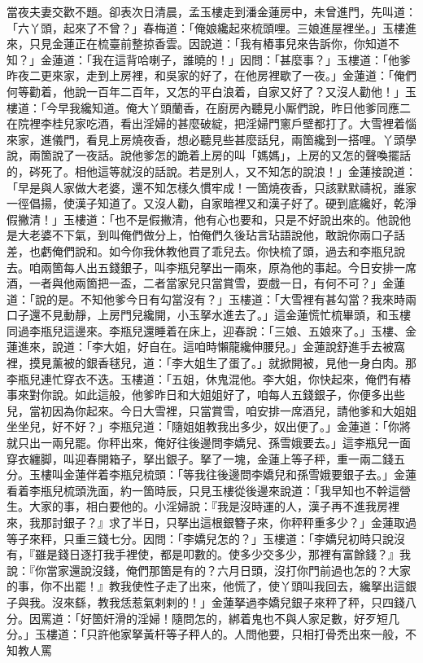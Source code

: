 當夜夫妻交歡不題。卻表次日清晨，孟玉樓走到潘金蓮房中，未曾進門，先叫道：「六丫頭，起來了不曾？」春梅道：「俺娘纔起來梳頭哩。三娘進屋裡坐。」玉樓進來，只見金蓮正在梳臺前整掠香雲。因說道：「我有樁事兒來告訴你，你知道不知？」金蓮道：「我在這背哈喇子，誰曉的！」因問：「甚麼事？」玉樓道：「他爹昨夜二更來家，走到上房裡，和吳家的好了，{}在他房裡歇了一夜。」金蓮道：「俺們何等勸着，他說一百年二百年，又怎的平白浪着，自家又好了？又沒人勸他！」玉樓道：「今早我纔知道。俺大丫頭蘭香，在廚房內聽見小厮們說，昨日他爹同應二在院裡李桂兒家吃酒，看出淫婦的甚麼破綻，把淫婦門窻戶壁都打了。大雪裡着惱來家，進儀門，看見上房燒夜香，想必聽見些甚麼話兒，{}兩箇纔到一搭哩。丫頭學說，兩箇說了一夜話。說他爹怎的跪着上房的叫「媽媽」，{}上房的又怎的聲喚擺話的，硶死了。相他這等就沒的話說。若是別人，又不知怎的說浪！」{}金蓮接說道：「早是與人家做大老婆，還不知怎樣久慣牢成！一箇燒夜香，只該默默禱祝，誰家一徑倡揚，使漢子知道了。又沒人勸，自家暗裡又和漢子好了。硬到底纔好，乾淨假撇清！」玉樓道：「也不是假撇清，{}他有心也要和，只是不好說出來的。他說他是大老婆不下氣，到叫俺們做分上，怕俺們久後玷言玷語說他，敢說你兩口子話差，也虧俺們說和。{}如今你我休教他買了乖兒去。你快梳了頭，過去和李瓶兒說去。咱兩箇每人出五錢銀子，叫李瓶兒拏出一兩來，原為他的事起。今日安排一席酒，一者與他兩箇把一盃，二者當家兒只當賞雪，耍戲一日，有何不可？」金蓮道：「說的是。不知他爹今日有勾當沒有？」玉樓道：「大雪裡有甚勾當？我來時兩口子還不見動靜，上房門兒纔開，小玉拏水進去了。」這金蓮慌忙梳畢頭，和玉樓同過李瓶兒這邊來。李瓶兒還睡着在床上，迎春說：「三娘、五娘來了。」玉樓、金蓮進來，說道：「李大姐，好自在。這咱時懶龍纔伸腰兒。」金蓮說舒進手去被窩裡，摸見薰被的銀香毬兒{}，道：「李大姐生了蛋了。」{}就掀開被，見他一身白肉。那李瓶兒連忙穿衣不迭。玉樓道：「五姐，休鬼混他。李大姐，你快起來，俺們有樁事來對你說。如此這般，他爹昨日和大姐姐好了，咱每人五錢銀子，你便多出些兒，當初因為你起來。今日大雪裡，只當賞雪，咱安排一席酒兒，請他爹和大姐姐坐坐兒，好不好？」李瓶兒道：「隨姐姐教我出多少，奴出便了。」金蓮道：「你將就只出一兩兒罷。{}你秤出來，俺好往後邊問李嬌兒、孫雪娥要去。」這李瓶兒一面穿衣纏脚，叫迎春開箱子，拏出銀子。拏了一塊，金蓮上等子秤，重一兩二錢五分。玉樓叫金蓮伴着李瓶兒梳頭：「等我往後邊問李嬌兒和孫雪娥要銀子去。」金蓮看着李瓶兒梳頭洗面，約一箇時辰，只見玉樓從後邊來說道：「我早知也不幹這營生。大家的事，相白要他的。小淫婦說：『我是沒時運的人，漢子再不進我房裡來，我那討銀子？』求了半日，只拏出這根銀簪子來，你秤秤重多少？」金蓮取過等子來秤，只重三錢七分。因問：「李嬌兒怎的？」玉樓道：「李嬌兒初時只說沒有，『雖是錢日逐打我手裡使，都是叩數的。使多少交多少，那裡有富餘錢？』我說：『你當家還說沒錢，俺們那箇是有的？{}六月日頭，沒打你門前過也怎的？大家的事，你不出罷！』教我使性子走了出來，他慌了，使丫頭叫我回去，纔拏出這銀子與我。沒來繇，教我恁惹氣剌剌的！」金蓮拏過李嬌兒銀子來秤了秤，只四錢八分。因罵道：「好箇奸滑的淫婦！隨問怎的，綁着鬼也不與人家足數，好歹短几分。」玉樓道：「只許他家拏黃杆等子秤人的。{}人問他要，只相打骨禿出來一般，不知教人罵